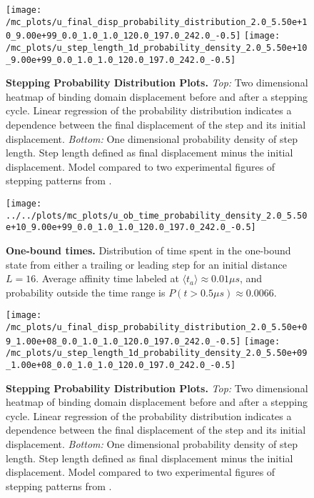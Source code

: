 \begin{figure}[H]
	\centering
	\texttt{[image: /mc\_plots/u\_final\_disp\_probability\_distribution\_2.0\_5.50e+10\_9.00e+99\_0.0\_1.0\_1.0\_120.0\_197.0\_242.0\_-0.5]}
	\texttt{[image: /mc\_plots/u\_step\_length\_1d\_probability\_density\_2.0\_5.50e+10\_9.00e+99\_0.0\_1.0\_1.0\_120.0\_197.0\_242.0\_-0.5]}
	\caption[Final Displacement Probability Distribution]{\textbf{Stepping Probability Distribution Plots.} \textit{Top:} Two dimensional heatmap of binding domain displacement before and after a stepping cycle. Linear regression of the probability distribution indicates a dependence between the final displacement of the step and its initial displacement. \textit{Bottom:} One dimensional probability density of step length. Step length defined as final displacement minus the initial displacement. Model compared to two experimental figures of stepping patterns from \citep{Dewitt2012}.} 
	\label{fig:DataFitYildiz99}
\end{figure}

\begin{figure}[H]
	\centering
	\texttt{[image: ../../plots/mc\_plots/u\_ob\_time\_probability\_density\_2.0\_5.50e+10\_9.00e+99\_0.0\_1.0\_1.0\_120.0\_197.0\_242.0\_-0.5]}
	\caption[One-bound times]{\textbf{One-bound times.} Distribution of time spent in the one-bound state from either a trailing or leading step for an initial distance $L=16$. Average affinity time labeled at $\langle t_a \rangle \approx 0.01 \mu s$, and probability outside the time range is $P(t>0.5\mu s) \approx 0.0066$.}
	\label{fig:OBtime99}
\end{figure}

\begin{figure}[H]
	\centering
	\texttt{[image: /mc\_plots/u\_final\_disp\_probability\_distribution\_2.0\_5.50e+09\_1.00e+08\_0.0\_1.0\_1.0\_120.0\_197.0\_242.0\_-0.5]}
	\texttt{[image: /mc\_plots/u\_step\_length\_1d\_probability\_density\_2.0\_5.50e+09\_1.00e+08\_0.0\_1.0\_1.0\_120.0\_197.0\_242.0\_-0.5]}
	\caption[Final Displacement Probability Distribution]{\textbf{Stepping Probability Distribution Plots.} \textit{Top:} Two dimensional heatmap of binding domain displacement before and after a stepping cycle. Linear regression of the probability distribution indicates a dependence between the final displacement of the step and its initial displacement. \textit{Bottom:} One dimensional probability density of step length. Step length defined as final displacement minus the initial displacement. Model compared to two experimental figures of stepping patterns from \citep{Dewitt2012}.} 
	\label{fig:DataFitYildiz09}
\end{figure}

